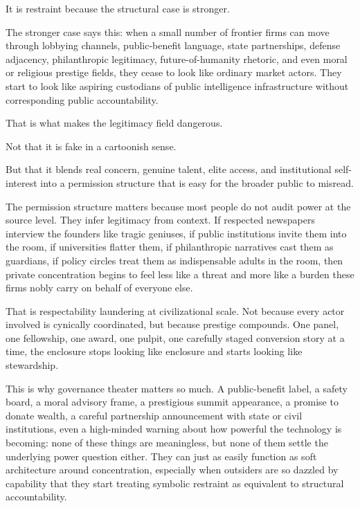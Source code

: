 \documentclass[
  american,
  12pt,
  letterpaper,
]{article}
\begin{document}
It is restraint because the structural case is stronger.

The stronger case says this: when a small number of frontier firms can
move through lobbying channels, public-benefit language, state
partnerships, defense adjacency, philanthropic legitimacy,
future-of-humanity rhetoric, and even moral or religious prestige
fields, they cease to look like ordinary market actors. They start to
look like aspiring custodians of public intelligence infrastructure
without corresponding public accountability.

That is what makes the legitimacy field dangerous.

Not that it is fake in a cartoonish sense.

But that it blends real concern, genuine talent, elite access, and
institutional self-interest into a permission structure that is easy for
the broader public to misread.

The permission structure matters because most people do not audit power
at the source level. They infer legitimacy from context. If respected
newspapers interview the founders like tragic geniuses, if public
institutions invite them into the room, if universities flatter them, if
philanthropic narratives cast them as guardians, if policy circles treat
them as indispensable adults in the room, then private concentration
begins to feel less like a threat and more like a burden these firms
nobly carry on behalf of everyone else.

That is respectability laundering at civilizational scale. Not because
every actor involved is cynically coordinated, but because prestige
compounds. One panel, one fellowship, one award, one pulpit, one
carefully staged conversion story at a time, the enclosure stops looking
like enclosure and starts looking like stewardship.

This is why governance theater matters so much. A public-benefit label,
a safety board, a moral advisory frame, a prestigious summit appearance,
a promise to donate wealth, a careful partnership announcement with
state or civil institutions, even a high-minded warning about how
powerful the technology is becoming: none of these things are
meaningless, but none of them settle the underlying power question
either. They can just as easily function as soft architecture around
concentration, especially when outsiders are so dazzled by capability
that they start treating symbolic restraint as equivalent to structural
accountability.
\end{document}
